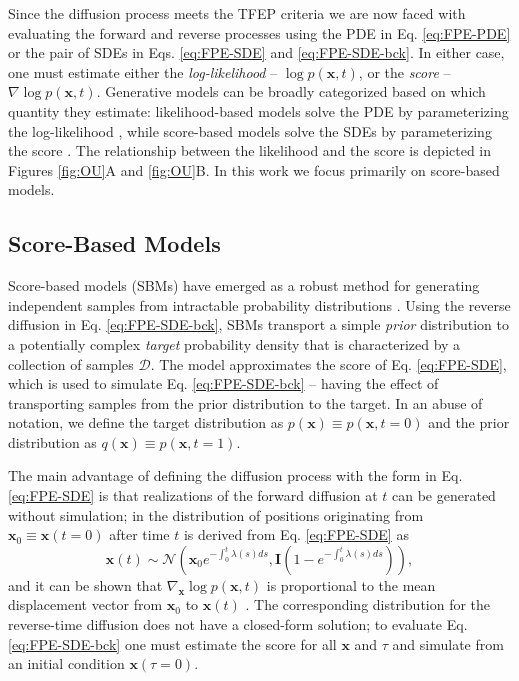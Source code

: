 \documentclass[9pt,twocolumn,twoside]{pnas-new}
\begin{document}
Since the diffusion process meets the TFEP criteria we are now faced with evaluating the forward and reverse processes using the PDE in Eq. \ref{eq:FPE-PDE} or the pair of SDEs in Eqs. \ref{eq:FPE-SDE} and \ref{eq:FPE-SDE-bck}. In either case, one must estimate either the {\it log-likelihood} -- $\log p(\mathbf{x}, t)$, or the {\it score} --  $\nabla \log p(\mathbf{x}, t)$. Generative models can be broadly categorized based on which quantity they estimate: likelihood-based models solve the PDE by parameterizing the log-likelihood \cite{NeuralODE, BG, NFReview}, while score-based models solve the SDEs by parameterizing the score \cite{sgm-sde, ddpm}. The relationship between the likelihood and the score is depicted in Figures \ref{fig:OU}A and \ref{fig:OU}B. In this work we focus primarily on score-based models.

\subsection*{Score-Based Models}

Score-based models (SBMs) have emerged as a robust method for generating independent samples from intractable probability distributions \cite{sgm-sde}. Using the reverse diffusion in Eq. \ref{eq:FPE-SDE-bck}, SBMs transport a simple {\it prior} distribution to a potentially complex {\it target} probability density that is characterized by a collection of samples $\mathcal{D}$. The model approximates the score of Eq. \ref{eq:FPE-SDE}, which is used to simulate Eq. \ref{eq:FPE-SDE-bck} -- having the effect of transporting samples from the prior distribution to the target. In an abuse of notation, we define the target distribution as $p(\mathbf{x}) \equiv p(\mathbf{x},t=0)$ and the prior distribution as $q(\mathbf{x}) \equiv p(\mathbf{x},t=1)$.

The main advantage of defining the diffusion process with the form in Eq. \ref{eq:FPE-SDE} is that realizations of the forward diffusion at $t$ can be generated without simulation; in \cite{sgm-sde} the distribution of positions originating from $\mathbf{x}_0 \equiv \mathbf{x}(t=0)$ after time $t$ is derived from Eq. \ref{eq:FPE-SDE} as
\begin{equation}
\mathbf{x}(t) \sim \mathcal{N}\left( \mathbf{x}_0 e^{-\int_0^t \lambda(s)ds },  \mathbf{I}(1 - e^{-\int_0^t \lambda(s)ds}) \right),
\label{eq:path-distribution}
\end{equation}
and it can be shown that $\nabla_{\mathbf{x}} \log p(\mathbf{x}, t)$ is proportional to the mean displacement vector from $\mathbf{x}_0$ to $\mathbf{x}(t)$ \cite{luo-unified-perspectives}. The corresponding distribution for the reverse-time diffusion does not have a closed-form solution; to evaluate Eq. \ref{eq:FPE-SDE-bck} one must estimate the score for all $\mathbf{x}$ and $\tau$ and simulate from an initial condition $\mathbf{x}(\tau=0)$.
\end{document}

